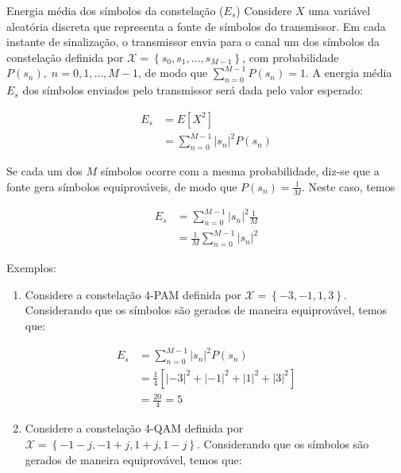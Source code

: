 \documentclass[
  ignorenonframetext,
]{beamer}
\providecommand{\tightlist}{%
  \setlength{\itemsep}{0pt}\setlength{\parskip}{0pt}}
\begin{document}
\begin{frame}{Energia média dos símbolos da constelação (\(E_s\))}
\label{energia-muxe9dia-dos-suxedmbolos-da-constelauxe7uxe3o-e_s}
Considere \(X\) uma variável aleatória discreta que representa a fonte
de símbolos do transmissor. Em cada instante de sinalização, o
transmissor envia para o canal um dos símbolos da constelação definida
por
\(\mathcal{X} = \left\lbrace s_0, s_1, \dots, s_{M-1}\right\rbrace\),
com probabilidade \(P(s_n),\;n = 0,1,\dots,M-1\), de modo que
\(\sum_{n=0}^{M-1}P(s_n)=1\). A energia média \(E_s\) dos símbolos
enviados pelo transmissor será dada pelo valor esperado:

\[\begin{aligned} E_s &= E\left[X^2\right] \\ &= \sum_{n=0}^{M-1}|s_n|^2P(s_n) \end{aligned} \]

Se cada um dos \(M\) símbolos ocorre com a mesma probabilidade, diz-se
que a fonte gera símbolos equiprováveis, de modo que
\(P(s_n)=\frac{1}{M}\). Neste caso, temos

\[ \begin{aligned} E_s &=\sum_{n=0}^{M-1}|s_n|^2\frac{1}{M} \\ &=  \frac{1}{M}\sum_{n=0}^{M-1}|s_n|^2\end{aligned} \]

Exemplos:

\begin{enumerate}
\tightlist
\item
  Considere a constelação 4-PAM definida por
  \(\mathcal{X} = \left\lbrace -3, -1, 1, 3\right\rbrace\). Considerando
  que os símbolos são gerados de maneira equiprovável, temos que:
\end{enumerate}

\[ \begin{aligned} E_s &=\sum_{n=0}^{M-1}|s_n|^2P(s_n) \\ &=  \frac{1}{4}\left[|-3|^2+|-1|^2+|1|^2+|3|^2\right] \\ &=  \frac{20}{4} = 5\end{aligned} \]

\begin{enumerate}
\setcounter{enumi}{1}
\tightlist
\item
  Considere a constelação 4-QAM definida por
  \(\mathcal{X} = \left\lbrace -1-j, -1+j, 1+j, 1-j\right\rbrace\).
  Considerando que os símbolos são gerados de maneira equiprovável,
  temos que:
\end{enumerate}


\end{frame}
\end{document}
